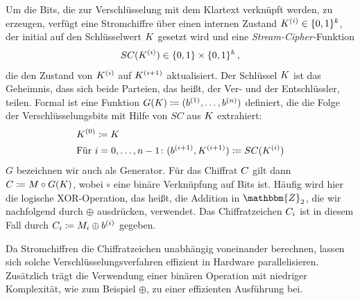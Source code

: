 Um die Bits, die zur Verschlüsselung mit dem Klartext verknüpft werden,
zu erzeugen, verfügt eine Stromchiffre über einen internen Zustand
$K^{(i)} \in \{0,1\}^k$, der initial auf den Schlüsselwert $K$
gesetzt wird und eine \emph{Stream-Cipher-}Funktion
\begin{align*}
  SC(K^{(i)}) \in \{0,1\} \times \{0,1\}^k\, ,
\end{align*}
die den Zustand von $K^{(i)}$ auf $K^{(i+1)}$ aktualisiert. Der
Schlüssel $K$ ist das Geheimnis, dass sich beide Parteien, das heißt,
der Ver- und der Entschlüssler, teilen. Formal ist eine Funktion
$G(K) \coloneqq (b^{(1)},\dots,b^{(n)})$ definiert, die die Folge der
Verschlüsselungsbits mit Hilfe von $SC$ aus $K$ extrahiert:
\begin{align*}
  &K^{(0)} \coloneqq K\\
  &\textnormal{Für } i = 0,\dots,n-1\colon (b^{(i+1)},K^{(i+1)})
    \coloneqq SC(K^{(i)})  
\end{align*}
$G$ bezeichnen wir auch als Generator. Für das Chiffrat $C$ gilt
dann $C \coloneqq M \circ G(K)$, wobei $\circ$ eine
binäre Verknüpfung auf Bits ist. Häufig wird hier die logische
XOR-Operation, das heißt, die Addition in $\mathbbm{Z}_{2}$, die wir
nachfolgend durch $\oplus$ ausdrücken, verwendet. Das Chiffratzeichen
$C_{i}$ ist in diesem Fall durch $C_{i} \coloneqq
M_{i} \oplus b^{(i)}$ gegeben.

Da Stromchiffren die Chiffratzeichen unabhängig voneinander berechnen,
lassen sich solche Verschlüsselungsverfahren effizient in Hardware
parallelisieren. Zusätzlich trägt die Verwendung einer binären Operation
mit niedriger Komplexität, wie zum Beispiel $\oplus$, zu einer
effizienten Ausführung bei.

